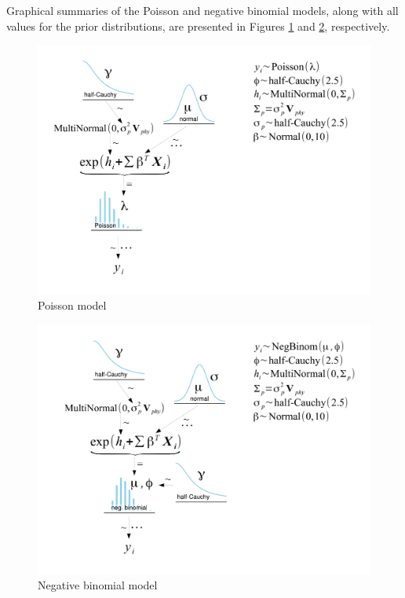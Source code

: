\documentclass[12pt,letterpaper]{article}
\begin{document}
Graphical summaries of the Poisson and negative binomial models, along with all values for the prior distributions, are presented in Figures \ref{fig:poismod_diagram} and \ref{fig:nbinmod_diagram}, respectively.
\begin{figure}[ht]
  \centering
  \includegraphics[height = 0.5\textheight, width = \textwidth, keepaspectratio = true]{figure/mammal_degree_model}
  \caption{Poisson model}
  \label{fig:poismod_diagram}
\end{figure}

\begin{figure}[ht]
  \centering
  \includegraphics[height = 0.5\textheight, width = \textwidth, keepaspectratio = true]{figure/mammal_deg_over_model}
  \caption{Negative binomial model}
  \label{fig:nbinmod_diagram}
\end{figure}
\end{document}
